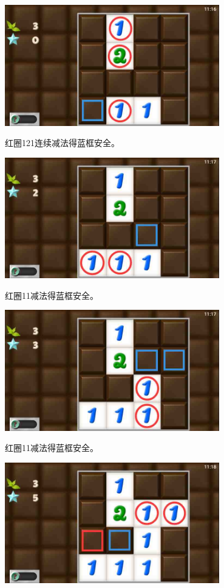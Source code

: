 \subsection{} %
\begin{center}
    \includegraphics[width=0.7\textwidth]{puzzlelow/21-1.jpg}
\end{center}
红圈121连续减法得蓝框安全。
\begin{center}
    \includegraphics[width=0.7\textwidth]{puzzlelow/21-2.jpg}
\end{center}
红圈11减法得蓝框安全。
\begin{center}
    \includegraphics[width=0.7\textwidth]{puzzlelow/21-3.jpg}
\end{center}
红圈11减法得蓝框安全。
\begin{center}
    \includegraphics[width=0.7\textwidth]{puzzlelow/21-4.jpg}
\end{center}
